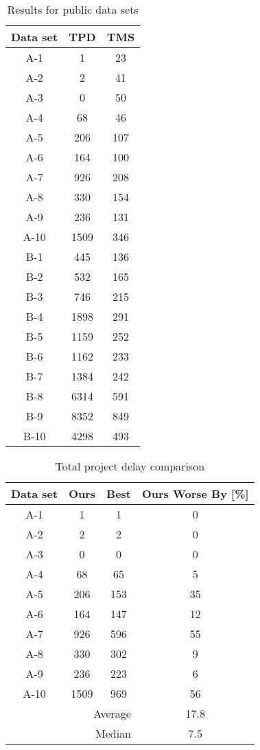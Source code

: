 \documentclass[10pt,a4paper]{article}
\begin{document}
\begin{table}
\caption{Results for public data sets}
\centering
\begin{tabular}{c||c|c}
Data set & TPD & TMS \\ 
\hline 
\hline 
A-1 & 1 & 23 \\ 
\hline 
A-2 & 2 & 41 \\ 
\hline 
A-3 & 0 & 50 \\ 
\hline 
A-4 & 68 & 46 \\ 
\hline 
A-5 & 206 & 107 \\ 
\hline 
A-6 & 164 & 100 \\ 
\hline 
A-7 & 926 & 208 \\ 
\hline 
A-8 & 330 & 154 \\ 
\hline 
A-9 & 236 & 131 \\ 
\hline 
A-10 & 1509 & 346\\ 
\hline 
B-1 & 445 & 136\\ 
\hline 
B-2 & 532 & 165\\ 
\hline 
B-3 & 746 & 215\\ 
\hline 
B-4 & 1898 & 291\\ 
\hline 
B-5 & 1159 & 252\\ 
\hline 
B-6 & 1162 & 233\\ 
\hline 
B-7 & 1384 & 242\\
\hline 
B-8 & 6314 & 591\\ 
\hline 
B-9 & 8352 & 849\\ 
\hline 
B-10 & 4298 & 493\\ 
\end{tabular} 
\label{table:results}
\end{table}

\begin{table}
\caption{Total project delay comparison}
\centering
\begin{tabular}{c||c|c||c}
Data set & Ours & Best & Ours Worse By [\%]\\ 
\hline 
\hline 
A-1 & 1 & 1 & 0\\ 
\hline 
A-2 & 2 & 2 & 0\\ 
\hline 
A-3 & 0 & 0 & 0\\ 
\hline 
A-4 & 68 & 65 & 5\\ 
\hline 
A-5 & 206 & 153 & 35\\ 
\hline 
A-6 & 164 & 147 & 12\\ 
\hline 
A-7 & 926 & 596 & 55\\ 
\hline 
A-8 & 330 & 302 & 9\\ 
\hline 
A-9 & 236 & 223 & 6\\ 
\hline 
A-10 & 1509 & 969 & 56\\
\hline 
\hline 
\multicolumn{3}{r||}{Average} & 17.8 \\ 
\multicolumn{3}{r||}{Median} & 7.5 \\ 
\end{tabular} 
\label{table:comparison}
\end{table}
\end{document}
